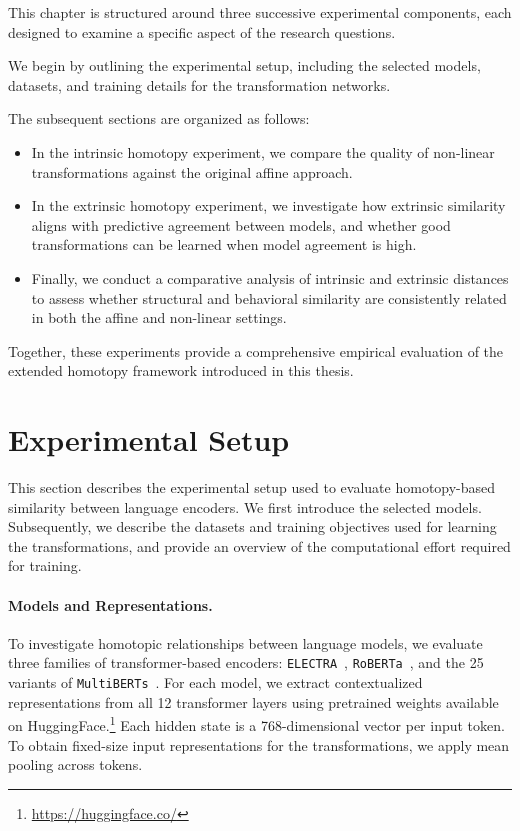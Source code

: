 This chapter is structured around three successive experimental components, each designed to examine a specific aspect of the research questions.

We begin by outlining the experimental setup, including the selected models, datasets, and training details for the transformation networks.

The subsequent sections are organized as follows:
\begin{itemize}
	\item In the intrinsic homotopy experiment, we compare the quality of non-linear transformations against the original affine approach.
	\item In the extrinsic homotopy experiment, we investigate how extrinsic similarity aligns with predictive agreement between models, and whether good transformations can be learned when model agreement is high.
	\item Finally, we conduct a comparative analysis of intrinsic and extrinsic distances to assess whether structural and behavioral similarity are consistently related in both the affine and non-linear settings.
\end{itemize}

Together, these experiments provide a comprehensive empirical evaluation of the extended homotopy framework introduced in this thesis.


\section{Experimental Setup}\label{sec:Exp_Setup}
This section describes the experimental setup used to evaluate homotopy-based similarity between language encoders.
We first introduce the selected models.
Subsequently, we describe the datasets and training objectives used for learning the transformations, and provide an overview of the computational effort required for training.
\paragraph{Models and Representations.}
To investigate homotopic relationships between language models, we evaluate three families of transformer-based encoders: \texttt{ELECTRA}~\cite{clark_electra_2020}, \texttt{RoBERTa}~\cite{liu_roberta_2019}, and the 25 variants of \texttt{MultiBERTs}~\cite{sellam_multiberts_2022}.
For each model, we extract contextualized representations from all 12 transformer layers using pretrained weights available on HuggingFace.\footnote{\url{https://huggingface.co/}} 
Each hidden state is a 768-dimensional vector per input token. 
To obtain fixed-size input representations for the transformations, we apply mean pooling across tokens.

